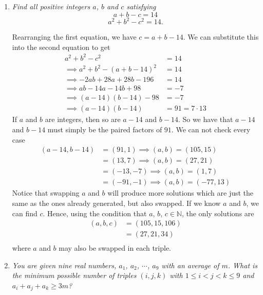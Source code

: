 \documentclass{article}
\begin{document}
\begin{enumerate}[1.]
\item %
{\itshape Find all positive integers $a$, $b$ and $c$ satisfying 
$$a + b - c = 14$$
$$a^2 + b^2 - c^2 = 14.$$}

Rearranging the first equation, we have $c = a + b - 14$. We can substitute this into the second equation to get 
\begin{align*}
  a^2 + b^2 - c^2 &= 14 \\
  \implies a^2 + b^2 - (a + b - 14)^2 &= 14 \\
  \implies -2ab + 28a + 28b - 196 &= 14 \\
  \implies ab - 14a - 14 b + 98 &= -7 \\
  \implies (a - 14)(b - 14) - 98 &= -7 \\
  \implies (a - 14)(b - 14) &= 91 = 7 \cdot 13
\end{align*}
If $a$ and $b$ are integers, then so are $a - 14$ and $b - 14$. So we have that $a - 14$ and $b - 14$ must simply be the paired factors of $91$. We can not check every case 
\begin{align*}
  (a - 14, b - 14) &= (91, 1) \implies (a, b) = (105, 15) \\
  &= (13, 7) \implies (a, b) = (27, 21) \\
  &= (-13, -7) \implies (a, b) = (1, 7) \\
  &= (-91, -1) \implies (a, b) = (-77, 13)
\end{align*}
Notice that swapping $a$ and $b$ will produce more solutions which are just the same as the ones already generated, but also swapped. If we know $a$ and $b$, we can find $c$. Hence, using the condition that $a$, $b$, $c \in \mathbb{N}$, the only solutions are
\begin{align*}
  (a, b, c) &= (105, 15, 106) \\
  &= (27, 21, 34) \\
\end{align*}
where $a$ and $b$ may also be swapped in each triple.

\item %
{\itshape You are given nine real numbers, $a_1$, $a_2$, $\cdots$, $a_9$ with an average of $m$. What is the minimum possible number of triples $(i, j, k)$ with $1 \le i < j < k \le 9$ and $a_i + a_j + a_k \ge 3m$?}


\end{enumerate}
\end{document}
